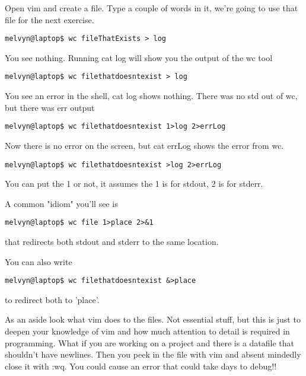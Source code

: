 \documentclass[10pt]{article}
\begin{document}
Open vim and create a file. Type a couple of words in it, we're going to use that file for the next exercise.

\begin{lstlisting}[style=term]
melvyn@laptop$ wc fileThatExists > log
\end{lstlisting}

 You see nothing. Running cat log will show you the output of the wc tool

\begin{lstlisting}[style=term]
melvyn@laptop$ wc filethatdoesntexist > log
\end{lstlisting}

 You see an error in the shell, cat log shows nothing. There was no std out of wc, but there was err output

\begin{lstlisting}[style=term]
melvyn@laptop$ wc filethatdoesntexist 1>log 2>errLog
\end{lstlisting}

 Now there is no error on the screen, but cat errLog shows the error from wc.

\begin{lstlisting}[style=term]
melvyn@laptop$ wc filethatdoesntexist >log 2>errLog
\end{lstlisting}

 You can put the 1 or not, it assumes the 1 is for stdout, 2 is for stderr.

A common "idiom" you'll see is

\begin{lstlisting}[style=term]
melvyn@laptop$ wc file 1>place 2>&1
\end{lstlisting}

 that redirects both stdout and stderr to the same location.

You can also write 
\begin{lstlisting}[style=term]
melvyn@laptop$ wc filethatdoesntexist &>place
\end{lstlisting}

 to redirect both to 'place'.

As an aside look what vim does to the files. Not essential stuff, but this is just to deepen your knowledge of vim and how much attention to detail is required in programming. What if you are working on a project and there is a datafile that shouldn't have newlines. Then you peek in the file with vim and absent mindedly close it with :wq. You could cause an error that could take days to debug!!
\end{document}
